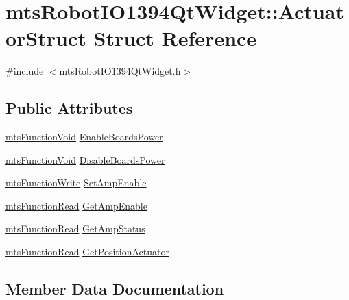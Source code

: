 \hypertarget{structmts_robot_i_o1394_qt_widget_1_1_actuator_struct}{}\section{mts\+Robot\+I\+O1394\+Qt\+Widget\+:\+:Actuator\+Struct Struct Reference}
\label{structmts_robot_i_o1394_qt_widget_1_1_actuator_struct}


{\ttfamily \#include $<$mts\+Robot\+I\+O1394\+Qt\+Widget.\+h$>$}

\subsection*{Public Attributes}
\begin{DoxyCompactItemize}
\item 
\hyperlink{classmts_function_void}{mts\+Function\+Void} \hyperlink{structmts_robot_i_o1394_qt_widget_1_1_actuator_struct_a5ccb45f1cdb9f9993a006edfedd77118}{Enable\+Boards\+Power}
\item 
\hyperlink{classmts_function_void}{mts\+Function\+Void} \hyperlink{structmts_robot_i_o1394_qt_widget_1_1_actuator_struct_afa0e0a70ea5ab7d803a6adb3c19f99ae}{Disable\+Boards\+Power}
\item 
\hyperlink{classmts_function_write}{mts\+Function\+Write} \hyperlink{structmts_robot_i_o1394_qt_widget_1_1_actuator_struct_a85ac6a5f967dce213eab71e5f2c44dde}{Set\+Amp\+Enable}
\item 
\hyperlink{classmts_function_read}{mts\+Function\+Read} \hyperlink{structmts_robot_i_o1394_qt_widget_1_1_actuator_struct_a020abb34a901cd2968f34d5bc39507c7}{Get\+Amp\+Enable}
\item 
\hyperlink{classmts_function_read}{mts\+Function\+Read} \hyperlink{structmts_robot_i_o1394_qt_widget_1_1_actuator_struct_a7c98ed643a2f51e4aa2adaee0b4989fc}{Get\+Amp\+Status}
\item 
\hyperlink{classmts_function_read}{mts\+Function\+Read} \hyperlink{structmts_robot_i_o1394_qt_widget_1_1_actuator_struct_a0e498ee30ff12970c23db900839d4c48}{Get\+Position\+Actuator}
\end{DoxyCompactItemize}


\subsection{Member Data Documentation}
\hypertarget{structmts_robot_i_o1394_qt_widget_1_1_actuator_struct_afa0e0a70ea5ab7d803a6adb3c19f99ae}{}
